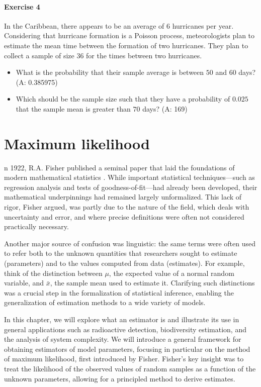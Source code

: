 \documentclass[
]{book}
\begin{document}
\hypertarget{exercise-4-5}{%
\subsubsection{Exercise 4}\label{exercise-4-5}}

In the Caribbean, there appears to be an average of \(6\) hurricanes per year. Considering that hurricane formation is a Poisson process, meteorologists plan to estimate the mean time between the formation of two hurricanes. They plan to collect a sample of size \(36\) for the times between two hurricanes.

\begin{itemize}
\item
  What is the probability that their sample average is between \(50\) and \(60\) days? (A: 0.385975)
\item
  Which should be the sample size such that they have a probability of \(0.025\) that the sample mean is greater than \(70\) days? (A: 169)
\end{itemize}

\hypertarget{maximum-likelihood}{%
\chapter{Maximum likelihood}\label{maximum-likelihood}}

n 1922, R.A. Fisher published a seminal paper that laid the foundations of modern mathematical statistics \citep{Fisher1922}. While important statistical techniques---such as regression analysis and tests of goodness-of-fit---had already been developed, their mathematical underpinnings had remained largely unformalized. This lack of rigor, Fisher argued, was partly due to the nature of the field, which deals with uncertainty and error, and where precise definitions were often not considered practically necessary.

Another major source of confusion was linguistic: the same terms were often used to refer both to the unknown quantities that researchers sought to estimate (parameters) and to the values computed from data (estimates). For example, think of the distinction between \(\mu\), the expected value of a normal random variable, and \(\bar{x}\), the sample mean used to estimate it. Clarifying such distinctions was a crucial step in the formalization of statistical inference, enabling the generalization of estimation methods to a wide variety of models.

In this chapter, we will explore what an estimator is and illustrate its use in general applications such as radioactive detection, biodiversity estimation, and the analysis of system complexity. We will introduce a general framework for obtaining estimators of model parameters, focusing in particular on the method of maximum likelihood, first introduced by Fisher. Fisher's key insight was to treat the likelihood of the observed values of random samples as a function of the unknown parameters, allowing for a principled method to derive estimates.
\end{document}
